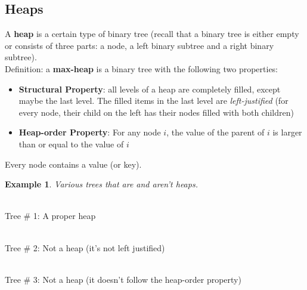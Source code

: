 \documentclass{report}
\newtheorem{ex}{Example}[section]
\begin{document}
\subsection{Heaps}
A \textbf{heap} is a certain type of binary tree (recall that a binary tree is either empty or consists of three parts: a node, a left binary subtree and a right binary subtree).\\
Definition: a \textbf{max-heap} is a binary tree with the following two properties:
\begin{itemize}
\item \textbf{Structural Property}: all levels of a heap are completely filled, except maybe the last level. The filled items in the last level are \textit{left-justified} (for every node, their child on the left has their nodes filled with both children)
\item \textbf{Heap-order Property}: For any node $i$, the value of the parent of $i$ is larger than or equal to the value of $i$
\end{itemize}
Every node contains a value (or key).\newpage
\begin{ex}
Various trees that are and aren't heaps.
\end{ex}
\begin{center}\\Tree \# 1: A proper heap\\\end{center}
\begin{center}
\\Tree \# 2: Not a heap (it's not left justified)\\\end{center}
\begin{center}
\\Tree \# 3: Not a heap (it doesn't follow the heap-order property)\end{center}
\end{document}
